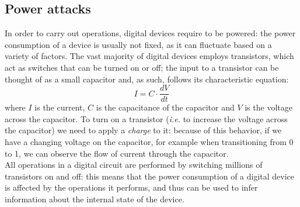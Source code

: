 \subsection{Power attacks}
In order to carry out operations, digital devices require to be powered: the power consumption of a device is usually not fixed, as it can fluctuate
based on a variety of factors. The vast majority of digital devices employs transistors, which act as switches that can be turned on or off; the input
to a transistor can be thought of as a small capacitor and, as such, follows its characteristic equation:
\begin{equation*}
    I = C \cdot \frac{dV}{dt}
\end{equation*}
where $I$ is the current, $C$ is the capacitance of the capacitor and $V$ is the voltage across the capacitor. To turn on a transistor 
(\textit{i.e.} to increase the voltage across the capacitor) we need to apply a \emph{charge} to it: because of this behavior, if we have a changing
voltage on the capacitor, for example when transitioning from 0 to 1, we can observe the flow of current through the capacitor. \\

All operations in a digital circuit are performed by switching millions of transistors on and off: this means that the power consumption
of a digital device is affected by the operations it performs, and thus can be used to infer information about the internal state of the device.

